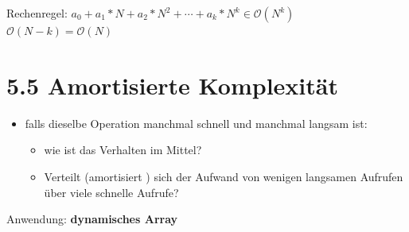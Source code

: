 \documentclass[11pt, fleqn]{scrreprt}
\newcommand{\bigO}[0]{\mathcal{O}}
\begin{document}
Rechenregel: $a_0 + a_1 * N + a_2 * N^2 + \cdots + a_k * N^k \in \bigO{}(N^k)$ \\
    \hspace*{3cm} $\bigO{}(N-k) = \bigO{}(N)$


\section*{5.5 Amortisierte Komplexität}
\begin{itemize}
    \item falls dieselbe Operation manchmal schnell und manchmal langsam ist:
    \begin{itemize}
        \item wie ist das Verhalten im Mittel?
        \item Verteilt (\glqq amortisiert \grqq) sich der Aufwand von wenigen langsamen Aufrufen über viele schnelle Aufrufe?
    \end{itemize}
\end{itemize}
Anwendung: \textbf{dynamisches Array}
\end{document}
